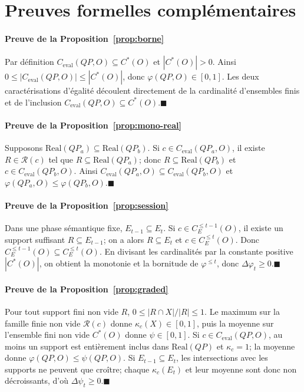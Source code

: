 \section{Preuves formelles complémentaires}
\label{app:formal-proofs}

\paragraph*{Preuve de la Proposition~\ref{prop:borne}}
Par définition $C_{\mathrm{eval}}(QP,O)\subseteq C^*(O)$ et $|C^*(O)|>0$. Ainsi $0\le |C_{\mathrm{eval}}(QP,O)|\le |C^*(O)|$, donc $\varphi(QP,O)\in[0,1]$. Les deux caractérisations d'égalité découlent directement de la cardinalité d'ensembles finis et de l'inclusion $C_{\mathrm{eval}}(QP,O)\subseteq C^*(O)$.\unskip\nobreak\hspace{0.5em}$\blacksquare$

\paragraph*{Preuve de la Proposition~\ref{prop:mono-real}}
Supposons $\mathrm{Real}(QP_a)\subseteq\mathrm{Real}(QP_b)$. Si $c\in C_{\mathrm{eval}}(QP_a,O)$, il existe $R\in\mathcal R(c)$ tel que $R\subseteq\mathrm{Real}(QP_a)$; donc $R\subseteq\mathrm{Real}(QP_b)$ et $c\in C_{\mathrm{eval}}(QP_b,O)$. Ainsi $C_{\mathrm{eval}}(QP_a,O)\subseteq C_{\mathrm{eval}}(QP_b,O)$ et $\varphi(QP_a,O)\le\varphi(QP_b,O)$.\unskip\nobreak\hspace{0.5em}$\blacksquare$

\paragraph*{Preuve de la Proposition~\ref{prop:session}}
Dans une phase sémantique fixe, $E_{t-1}\subseteq E_t$. Si $c\in C_E^{\le t-1}(O)$, il existe un support suffisant $R\subseteq E_{t-1}$; on a alors $R\subseteq E_t$ et $c\in C_E^{\le t}(O)$. Donc $C_E^{\le t-1}(O)\subseteq C_E^{\le t}(O)$. En divisant les cardinalités par la constante positive $|C^*(O)|$, on obtient la monotonie et la bornitude de $\varphi^{\le t}$, donc $\Delta\varphi_t\ge0$.\unskip\nobreak\hspace{0.5em}$\blacksquare$

\paragraph*{Preuve de la Proposition~\ref{prop:graded}}
Pour tout support fini non vide $R$, $0\le |R\cap X|/|R|\le1$. Le maximum sur la famille finie non vide $\mathcal R(c)$ donne $\kappa_c(X)\in[0,1]$, puis la moyenne sur l'ensemble fini non vide $C^*(O)$ donne $\psi\in[0,1]$. Si $c\in C_{\mathrm{eval}}(QP,O)$, au moins un support est entièrement inclus dans $\mathrm{Real}(QP)$ et $\kappa_c=1$; la moyenne donne $\varphi(QP,O)\le\psi(QP,O)$. Si $E_{t-1}\subseteq E_t$, les intersections avec les supports ne peuvent que croître; chaque $\kappa_c(E_t)$ et leur moyenne sont donc non décroissants, d'où $\Delta\psi_t\ge0$.\unskip\nobreak\hspace{0.5em}$\blacksquare$

